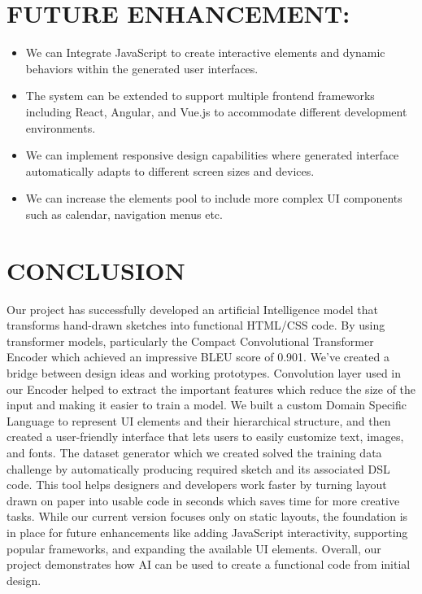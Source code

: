 
\section{\MakeUppercase{Future Enhancement:}}
\begin{itemize}
    \item We can Integrate JavaScript to create interactive elements and dynamic behaviors within
    the generated user interfaces.
    \item The system can be extended to support multiple frontend frameworks including React,
    Angular, and Vue.js to accommodate different development environments.
    \item We can implement responsive design capabilities where generated interface
    automatically adapts to different screen sizes and devices.
    \item We can increase the elements pool to include more complex UI components such as
    calendar, navigation menus etc.
\end{itemize}
    \pagebreak

\section{\MakeUppercase{Conclusion}}
Our project has successfully developed an artificial Intelligence model that transforms hand-drawn
sketches into functional HTML/CSS code. By using transformer models, particularly the Compact
Convolutional Transformer Encoder which achieved an impressive BLEU score of 0.901. We've created a
bridge between design ideas and working prototypes. Convolution layer used in our Encoder helped to
extract the important features which reduce the size of the input and making it easier to train a model.
We built a custom Domain Specific Language to represent UI elements and their hierarchical structure,
and then created a user-friendly interface that lets users to easily customize text, images, and fonts. The
dataset generator which we created solved the training data challenge by automatically producing
required sketch and its associated DSL code. This tool helps designers and developers work faster by
turning layout drawn on paper into usable code in seconds which saves time for more creative tasks.
While our current version focuses only on static layouts, the foundation is in place for future
enhancements like adding JavaScript interactivity, supporting popular frameworks, and expanding the
available UI elements. Overall, our project demonstrates how AI can be used to create a functional code
from initial design.
\pagebreak
